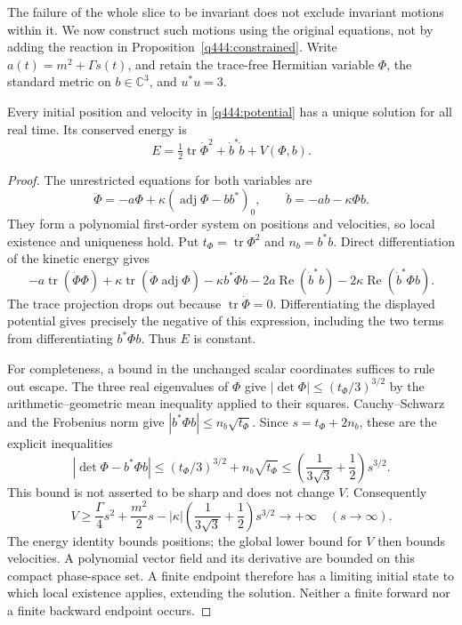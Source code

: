 The failure of the whole slice to be invariant does not exclude invariant
motions within it. We now construct such motions using the original
equations, not by adding the reaction in Proposition~\ref{q444:constrained}.
Write $a(t)=m^2+\Gamma s(t)$, and retain the trace-free Hermitian variable
$\Phi$, the standard metric on $b\in\mathbb C^3$, and $u^*u=3$.

\begin{lemma}\label{q444:global}
Every initial position and velocity in \eqref{q444:potential} has a unique
solution for all real time. Its conserved energy is
\[
 E=\tfrac12\operatorname{tr}\dot\Phi^2+\dot b^*\dot b+V(\Phi,b).
\]
\end{lemma}
\begin{proof}
The unrestricted equations for both variables are
\begin{equation}\label{q444:full-eom}
 \ddot\Phi=-a\Phi+\kappa(\operatorname{adj}\Phi-bb^*)_0,
 \qquad \ddot b=-ab-\kappa\Phi b.
\end{equation}
They form a polynomial first-order system on positions and velocities,
so local existence and uniqueness hold. Put $t_\Phi=\operatorname{tr}\Phi^2$
and $n_b=b^*b$. Direct differentiation of the kinetic energy gives
\[
 -a\operatorname{tr}(\dot\Phi\Phi)
 +\kappa\operatorname{tr}(\dot\Phi\operatorname{adj}\Phi)
 -\kappa b^*\dot\Phi b
 -2a\operatorname{Re}(\dot b^*b)
 -2\kappa\operatorname{Re}(\dot b^*\Phi b).
\]
The trace projection drops out because $\operatorname{tr}\dot\Phi=0$.
Differentiating the displayed potential gives precisely the negative of
this expression, including the two terms from differentiating $b^*\Phi b$.
Thus $E$ is constant.

For completeness, a bound in the unchanged scalar coordinates suffices
to rule out escape. The three real eigenvalues of $\Phi$ give
$|\det\Phi|\leq(t_\Phi/3)^{3/2}$ by the arithmetic--geometric mean
inequality applied to their squares. Cauchy--Schwarz and the Frobenius
norm give $|b^*\Phi b|\leq n_b\sqrt{t_\Phi}$. Since
$s=t_\Phi+2n_b$, these are the explicit inequalities
\[
 |\det\Phi-b^*\Phi b|
 \leq (t_\Phi/3)^{3/2}+n_b\sqrt{t_\Phi}
 \leq \left(\frac1{3\sqrt3}+\frac12\right)s^{3/2}.
\]
This bound is not asserted to be sharp and does not change $V$.
Consequently
\[
 V\geq \frac{\Gamma}{4}s^2+\frac{m^2}{2}s
       -|\kappa|\left(\frac1{3\sqrt3}+\frac12\right)s^{3/2}
       \longrightarrow+\infty\quad(s\longrightarrow\infty).
\]
The energy identity bounds positions; the global lower bound for $V$
then bounds velocities. A polynomial vector field and its derivative are
bounded on this compact phase-space set. A finite endpoint therefore has
a limiting initial state to which local existence applies, extending the
solution. Neither a finite forward nor a finite backward endpoint occurs.
\end{proof}


